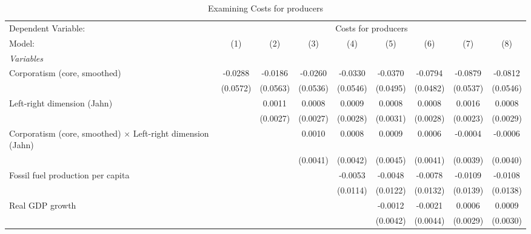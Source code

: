 
\begin{table}[htbp]
   \caption{Examining Costs for producers}
   \centering
   \begin{tabular}{lcccccccc}
      \tabularnewline \midrule \midrule
      Dependent Variable: & \multicolumn{8}{c}{Costs for producers}\\
      Model:                                                             & (1)      & (2)      & (3)      & (4)      & (5)      & (6)      & (7)      & (8)\\  
      \midrule
      \emph{Variables}\\
      Corporatism (core, smoothed)                                       & -0.0288  & -0.0186  & -0.0260  & -0.0330  & -0.0370  & -0.0794  & -0.0879  & -0.0812\\   
                                                                         & (0.0572) & (0.0563) & (0.0536) & (0.0546) & (0.0495) & (0.0482) & (0.0537) & (0.0546)\\   
      Left-right dimension (Jahn)                                        &          & 0.0011   & 0.0008   & 0.0009   & 0.0008   & 0.0008   & 0.0016   & 0.0008\\   
                                                                         &          & (0.0027) & (0.0027) & (0.0028) & (0.0031) & (0.0028) & (0.0023) & (0.0029)\\   
      Corporatism (core, smoothed) $\times$ Left-right dimension (Jahn)  &          &          & 0.0010   & 0.0008   & 0.0009   & 0.0006   & -0.0004  & -0.0006\\   
                                                                         &          &          & (0.0041) & (0.0042) & (0.0045) & (0.0041) & (0.0039) & (0.0040)\\   
      Fossil fuel production per capita                                  &          &          &          & -0.0053  & -0.0048  & -0.0078  & -0.0109  & -0.0108\\   
                                                                         &          &          &          & (0.0114) & (0.0122) & (0.0132) & (0.0139) & (0.0138)\\   
      Real GDP growth                                                    &          &          &          &          & -0.0012  & -0.0021  & 0.0006   & 0.0009\\   
                                                                         &          &          &          &          & (0.0042) & (0.0044) & (0.0029) & (0.0030)\\   

\end{tabular}
\end{table}
